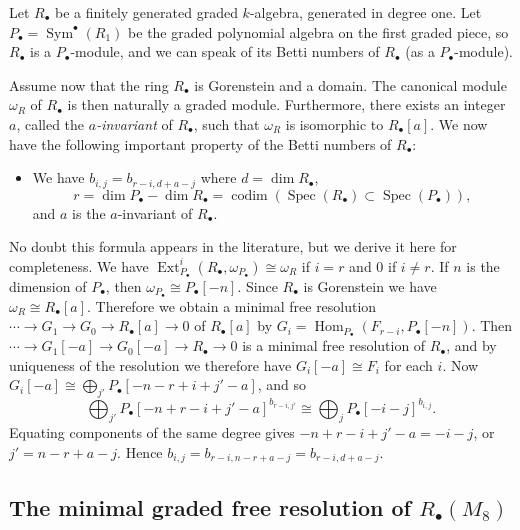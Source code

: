 \documentclass{amsart}
\theoremstyle{definition}
\theoremstyle{remark}
\DeclareMathOperator{\Sym}{Sym}
\DeclareMathOperator{\Hom}{Hom}
\DeclareMathOperator{\Spec}{Spec}
\DeclareMathOperator{\codim}{codim}
\DeclareMathOperator{\Ext}{Ext}
\begin{document}
Let $R_{\bullet}$ be a finitely generated graded $k$-algebra,  generated in degree one.  Let $P_{\bullet}=
\Sym^{\bullet}(R_1)$ be the graded polynomial algebra on the first graded piece, so $R_{\bullet}$ is a
$P_{\bullet}$-module, and we can speak of its Betti numbers of $R_{\bullet}$ (as a $P_{\bullet}$-module).

Assume now that the ring $R_{\bullet}$ is Gorenstein and a domain.  The canonical module $\omega_R$ of $R_{\bullet}$ is
then naturally a graded module.  Furthermore, there exists an integer $a$, called the \emph{$a$-invariant} of
$R_{\bullet}$, such that $\omega_R$ is isomorphic to $R_{\bullet}[a]$.  We now have the following important property of
the Betti numbers of $R_{\bullet}$:
\begin{itemize}
\item[(B6)] We have $b_{i, j}=b_{r-i, d+a-j}$ where $d=\dim{R_{\bullet}}$,
\begin{displaymath}
r=\dim{P_{\bullet}}-\dim{R_{\bullet}}=\codim(\Spec(R_{\bullet}) \subset \Spec(P_{\bullet})),
\end{displaymath}
and $a$ is the $a$-invariant of $R_{\bullet}$.
\end{itemize}
No doubt this formula appears in the literature, but we derive it here for completeness.  We have $\Ext^i_{P_{\bullet}}
(R_{\bullet}, \omega_{P_{\bullet}}) \cong \omega_R$ if $i=r$ and $0$ if $i \neq r$.  If $n$ is the dimension of
$P_{\bullet}$, then $\omega_{P_{\bullet}} \cong P_{\bullet}[-n]$.  Since $R_{\bullet}$ is Gorenstein we have $\omega_R
\cong R_{\bullet}[a]$.  Therefore we obtain a minimal free resolution $\cdots \to G_1 \to G_0 \to R_{\bullet}[a] \to 0$
of $R_{\bullet}[a]$ by $G_i=\Hom_{P_{\bullet}}(F_{r-i}, P_{\bullet}[-n])$.  Then $\cdots \to G_1[-a] \to G_0[-a] \to
R_{\bullet} \to 0$ is a minimal free resolution of $R_{\bullet}$, and by uniqueness of the resolution we therefore have
$G_i[-a] \cong F_i$ for each $i$.  Now $G_i[-a] \cong \bigoplus_{j'} P_{\bullet}[-n-r+i+j'-a]$, and so
\begin{displaymath}
\bigoplus_{j'} P_{\bullet}[-n+r-i+j'-a]^{b_{r-i,j'}} \cong \bigoplus_j P_{\bullet}[-i-j]^{b_{i,j}}.
\end{displaymath}
Equating components of the same degree gives $-n+r-i+j'-a=-i-j$, or $j'=n-r+a-j$.  Hence $b_{i,j}=b_{r-i, n-r+a-j}
=b_{r-i, d+a-j}$.


\subsection{The minimal graded free resolution of  $R_{\bullet}(M_8)$}
\label{s:betti}
\end{document}
